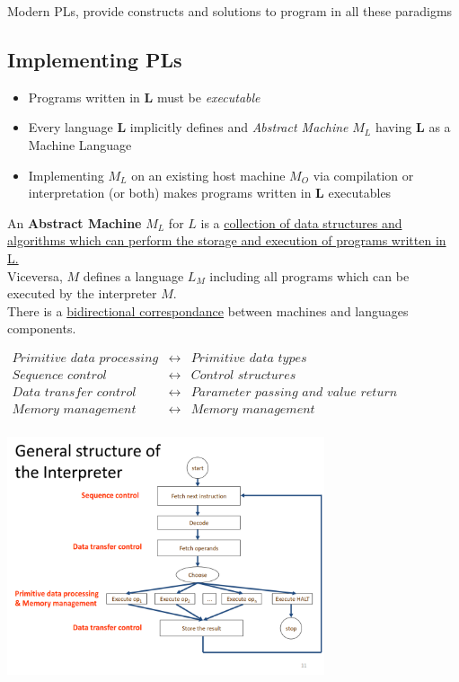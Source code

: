 Modern PLs, provide constructs and solutions to program in all these paradigms

\subsection{Implementing PLs}
\begin{itemize}
    \item Programs written in \textbf{L} must be \textit{executable}
    \item Every language \textbf{L} implicitly defines and \textit{Abstract Machine} \textbf{$M_L$} having \textbf{L} as a Machine Language
    \item Implementing $M_L$ on an existing host machine $M_O$ via compilation or interpretation (or both) makes programs written in \textbf{L} executables 
\end{itemize}

An \textbf{Abstract Machine} $M_L$ for $L$ is a \ul{collection of data structures and algorithms which can perform the storage and execution of programs written in L.}\\
Viceversa, $M$ defines a language $L_M$ including all programs which can be executed by the interpreter $M$.\\
There is a \ul{bidirectional correspondance} between machines and languages components.\\
\begin{center}
$
\begin{array}{ccc}
    \textit{Primitive data processing} & \longleftrightarrow & \textit{Primitive data types}  \\
    \textit{Sequence control} & \longleftrightarrow & \textit{Control structures}  \\
    \textit{Data transfer control }& \longleftrightarrow & \textit{Parameter passing and value return}  \\
    \textit{Memory management }& \longleftrightarrow & \textit{Memory management}\\
     & 
\end{array}
$   
\end{center}

\begin{center}
\includegraphics[width=0.7\textwidth]{images/interpreter_structure.png}
\end{center}

